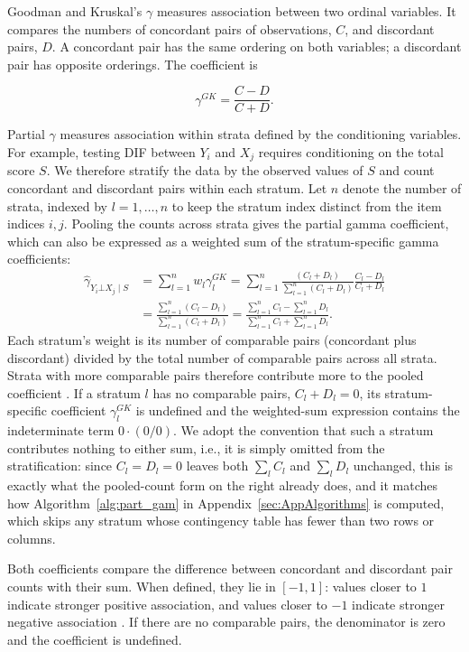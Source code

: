 Goodman and Kruskal's $\gamma$ \citeyearpar{goodman-kruskal-1954} measures association between two ordinal variables. It compares the numbers of concordant pairs of observations, $C$, and discordant pairs, $D$. A concordant pair has the same ordering on both variables; a discordant pair has opposite orderings. The coefficient is

\begin{equation}
\gamma^{GK} = \frac{C-D}{C+D}.
\end{equation}

Partial $\gamma$ \citep{davis-1967} measures association within strata defined by the conditioning variables. For example, testing DIF between $Y_i$ and $X_j$ requires conditioning on the total score $S$. We therefore stratify the data by the observed values of $S$ and count concordant and discordant pairs within each stratum. Let $n$ denote the number of strata, indexed by $l=1,\dots,n$ to keep the stratum index distinct from the item indices $i,j$. Pooling the counts across strata gives the partial gamma coefficient, which can also be expressed as a weighted sum of the stratum-specific gamma coefficients:
\begin{align}
    \hat{\gamma}_{Y_i\bot X_j\mid S} &= \sum_{l=1}^n w_l\gamma^{GK}_l = \sum_{l=1}^n\frac{(C_l+D_l)}{\sum_{l=1}^n(C_l+D_l)}\frac{C_l-D_l}{C_l+D_l} \\
    &= \frac{\sum_{l=1}^n(C_l-D_l)}{\sum_{l=1}^n(C_l+D_l)} = \frac{\sum_{l=1}^nC_l-\sum_{l=1}^nD_l}{\sum_{l=1}^nC_l+\sum_{l=1}^nD_l}.
\end{align}
Each stratum's weight is its number of comparable pairs (concordant plus discordant) divided by the total number of comparable pairs across all strata. Strata with more comparable pairs therefore contribute more to the pooled coefficient \citep{agresti-1984}. If a stratum $l$ has no comparable pairs, $C_l+D_l=0$, its stratum-specific coefficient $\gamma^{GK}_l$ is undefined and the weighted-sum expression contains the indeterminate term $0\cdot(0/0)$. We adopt the convention that such a stratum contributes nothing to either sum, i.e., it is simply omitted from the stratification: since $C_l=D_l=0$ leaves both $\sum_l C_l$ and $\sum_l D_l$ unchanged, this is exactly what the pooled-count form on the right already does, and it matches how Algorithm~\ref{alg:part_gam} in Appendix~\ref{sec:AppAlgorithms} is computed, which skips any stratum whose contingency table has fewer than two rows or columns.

Both coefficients compare the difference between concordant and discordant pair counts with their sum. When defined, they lie in $[-1,1]$: values closer to $1$ indicate stronger positive association, and values closer to $-1$ indicate stronger negative association \citep{agresti-1984}. If there are no comparable pairs, the denominator is zero and the coefficient is undefined.
